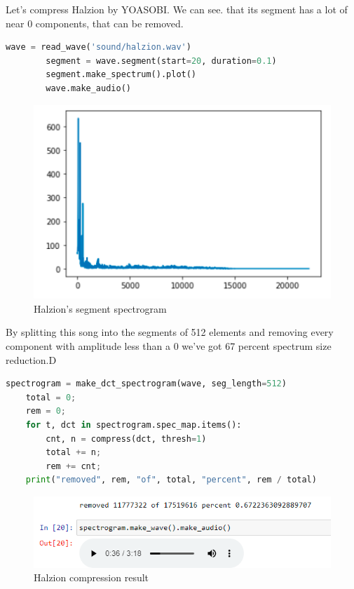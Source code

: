 \documentclass[a4paper]{article}
\begin{document}
        Let's compress Halzion by YOASOBI. We can see. that its segment has a lot of near 0 components, that can be removed.
        
        \begin{lstlisting}[language=Python,caption=Reading the waver,label={lst:part1_2}]
    wave = read_wave('sound/halzion.wav')
        segment = wave.segment(start=20, duration=0.1)
        segment.make_spectrum().plot()
        wave.make_audio()
        \end{lstlisting}
        
        \begin{figure}[H]
            \centering
            \includegraphics[width=\textwidth]{img/halzion_spec.png}
            \caption{Halzion's segment spectrogram}
            \label{fig:part1_1_2}
        \end{figure}
        
        By splitting this song into the segments of 512 elements and removing every component with amplitude less than a 0 we've got 67 percent spectrum size reduction.D
            
        \begin{lstlisting}[language=Python,caption={Compression of the wave},label={lst:sawtooth_def}]
    spectrogram = make_dct_spectrogram(wave, seg_length=512)
    total = 0;
    rem = 0;
    for t, dct in spectrogram.spec_map.items():
        cnt, n = compress(dct, thresh=1)
        total += n;
        rem += cnt;
    print("removed", rem, "of", total, "percent", rem / total)
        \end{lstlisting}
        
        \begin{figure}[H]
            \centering
            \includegraphics[width=\textwidth]{img/halzion_comp.png}
            \caption{Halzion compression result}
            \label{fig:part1_1_2}
        \end{figure}
        
\end{document}

